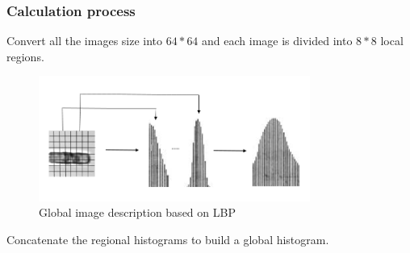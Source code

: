 \documentclass[notheorems, serif, table, compress]{beamer}  %
\begin{document}
\begin{frame}[fragile]
\frametitle{Calculation process}

Convert all the images size into $64*64$ and each image is divided into $8*8$ local regions.
\begin{figure}[!ht]
\centering
\includegraphics[width=3.5in]{lbpglobal.png}
\caption{Global image description based on LBP}
\label{fig_5}
\end{figure}

Concatenate the regional histograms to build a global histogram.


\end{frame}




\end{document}
